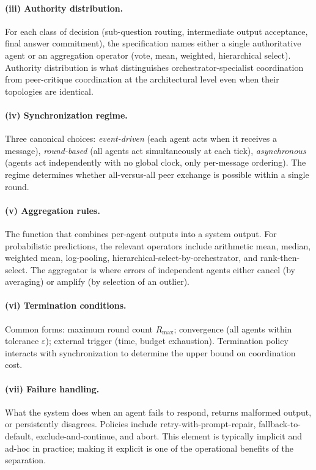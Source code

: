 \documentclass[11pt]{article}
\begin{document}
\paragraph{(iii) Authority distribution.}
For each class of decision (sub-question routing, intermediate output acceptance, final answer commitment), the specification names either a single authoritative agent or an aggregation operator (vote, mean, weighted, hierarchical select). Authority distribution is what distinguishes orchestrator-specialist coordination from peer-critique coordination at the architectural level even when their topologies are identical.

\paragraph{(iv) Synchronization regime.}
Three canonical choices: \emph{event-driven} (each agent acts when it receives a message), \emph{round-based} (all agents act simultaneously at each tick), \emph{asynchronous} (agents act independently with no global clock, only per-message ordering). The regime determines whether all-versus-all peer exchange is possible within a single round.

\paragraph{(v) Aggregation rules.}
The function that combines per-agent outputs into a system output. For probabilistic predictions, the relevant operators include arithmetic mean, median, weighted mean, log-pooling, hierarchical-select-by-orchestrator, and rank-then-select. The aggregator is where errors of independent agents either cancel (by averaging) or amplify (by selection of an outlier).

\paragraph{(vi) Termination conditions.}
Common forms: maximum round count $R_{\max}$; convergence (all agents within tolerance $\varepsilon$); external trigger (time, budget exhaustion). Termination policy interacts with synchronization to determine the upper bound on coordination cost.

\paragraph{(vii) Failure handling.}
What the system does when an agent fails to respond, returns malformed output, or persistently disagrees. Policies include retry-with-prompt-repair, fallback-to-default, exclude-and-continue, and abort. This element is typically implicit and ad-hoc in practice; making it explicit is one of the operational benefits of the separation.
\end{document}
